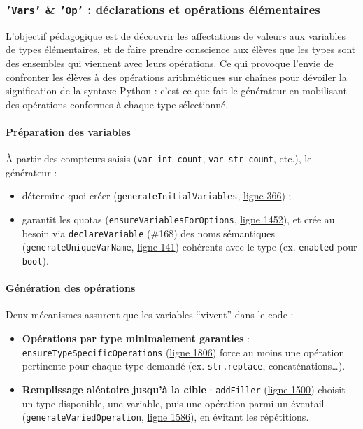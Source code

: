 \documentclass[11pt,a4paper]{article}
\begin{document}
\subsubsection{\texttt{'Vars'} \& \texttt{'Op'} : déclarations et opérations élémentaires}
L'objectif pédagogique est de découvrir les affectations de valeurs aux variables de types élémentaires, et de faire prendre conscience aux élèves que les types sont des ensembles qui viennent avec leurs opérations. Ce qui provoque l'envie de confronter les élèves à des opérations arithmétiques sur chaînes pour dévoiler la signification de la syntaxe Python : c'est ce que fait le générateur en mobilisant des opérations conformes à chaque type sélectionné.

\paragraph{Préparation des variables}
À partir des compteurs saisis (\texttt{var\_int\_count}, \texttt{var\_str\_count}, etc.), le générateur :
\begin{itemize}
  \item détermine quoi créer (\texttt{generateInitialVariables}, \href{https://github.com/edu-mateescoj/gyminf/blob/main/static/js/code-generator.js#L1083}{ligne 366}) ;
  \item garantit les quotas (\texttt{ensureVariablesForOptions}, \href{https://github.com/edu-mateescoj/gyminf/blob/main/static/js/code-generator.js#L1083}{ligne 1452}), et crée au besoin via \texttt{declareVariable} (\#168) des noms sémantiques (\texttt{generateUniqueVarName}, \href{https://github.com/edu-mateescoj/gyminf/blob/main/static/js/code-generator.js#L1083}{ligne 141}) cohérents avec le type (ex. \texttt{enabled} pour \texttt{bool}).
\end{itemize}

\paragraph{Génération des opérations}
Deux mécanismes assurent que les variables “vivent” dans le code :
\begin{itemize}
  \item \textbf{Opérations par type minimalement garanties} : \texttt{ensureTypeSpecificOperations} (\href{https://github.com/edu-mateescoj/gyminf/blob/main/static/js/code-generator.js#L1083}{ligne 1806}) force au moins une opération pertinente pour chaque type demandé (ex. \texttt{str.replace}, concaténations…).
  \item \textbf{Remplissage aléatoire jusqu’à la cible} : \texttt{addFiller} (\href{https://github.com/edu-mateescoj/gyminf/blob/main/static/js/code-generator.js#L1083}{ligne 1500}) choisit un type disponible, une variable, puis une opération parmi un éventail (\texttt{generateVariedOperation}, \href{https://github.com/edu-mateescoj/gyminf/blob/main/static/js/code-generator.js#L1083}{ligne 1586}), en évitant les répétitions.
\end{itemize}
\end{document}
